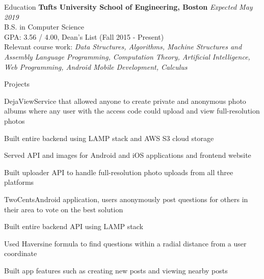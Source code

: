 \documentclass{resume}
\begin{document}
  \begin{rSection}{Education}
    {\bf Tufts University School of Engineering, Boston} \hfill {\em Expected May 2019} \\ 
    { B.S. in Computer Science} \\
    GPA: 3.56 / 4.00, Dean's List (Fall 2015 - Present)\\
    Relevant course work: \textit{Data Structures, Algorithms, Machine Structures and Assembly Language Programming, Computation Theory, Artificial Intelligence, Web Programming, Android Mobile Development, Calculus}
  \end{rSection}
  
  \begin{rSection}{Projects}
  
  \begin{rSubsection}{DejaView}{}{\normalfont Service that allowed anyone to create private and anonymous photo albums where any user with the access code could upload and view full-resolution photos}{}
  \item Built entire backend using LAMP stack and AWS S3 cloud storage
  \item Served API and images for Android and iOS applications and frontend website
  \item Built uploader API to handle full-resolution photo uploads from all three platforms
  \end{rSubsection}
  
  \begin{rSubsection}{TwoCents}{}{\normalfont Android application, users anonymously post questions for others in their area to vote on the best solution}{}
    \item Built entire backend API using LAMP stack  
    \item Used Haversine formula to find questions within a radial distance from a user coordinate
    \item Built app features such as creating new posts and viewing nearby posts
  \end{rSubsection}
   
  \end{rSection}
  
\end{document}
